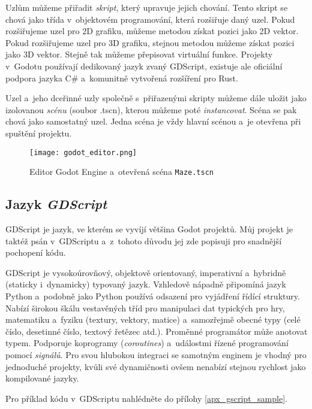Uzlům můžeme přiřadit \textit{skript}, který upravuje jejich chování. Tento skript se chová jako třída v~objektovém programování, která rozšiřuje daný uzel. Pokud rozšiřujeme uzel pro 2D grafiku, můžeme metodou získat pozici jako 2D vektor. Pokud rozšiřujeme uzel pro 3D grafiku, stejnou metodou můžeme získat pozici jako 3D vektor. Stejně tak můžeme přepisovat virtuální funkce. Projekty v~Godotu používají dedikovaný jazyk zvaný GDScript, existuje ale oficiální podpora jazyka C\# a~komunitně vytvořená rozšíření pro Rust.

Uzel a~jeho dceřinné uzly společně s~přiřazenými skripty můžeme dále uložit jako izolovanou \textit{scénu} (soubor .tscn), kterou můžeme poté \textit{instancovat}. Scéna se pak chová jako samostatný uzel. Jedna scéna je vždy hlavní scénou a~je otevřena při spuštění projektu.

\begin{figure}[H]
  \centering
  \texttt{[image: godot\_editor.png]}
  \caption{Editor Godot Engine a~otevřená scéna \texttt{Maze.tscn}}
  \label{godot_editor_maze_tscn}
\end{figure}

\subsection{Jazyk \textit{GDScript}}

GDScript je jazyk, ve kterém se vyvíjí většina Godot projektů. Můj projekt je taktéž psán v~GDScriptu a~z~tohoto důvodu jej zde popisuji pro snadnější pochopení kódu.

GDScript je vysokoúrovňový, objektově orientovaný, imperativní a~hybridně (staticky i~dynamicky) typovaný jazyk. Vzhledově nápadně připomíná jazyk Python a~podobně jako Python používá odsazení pro vyjádření řídící struktury. Nabízí širokou škálu vestavěných tříd pro manipulaci dat typických pro hry, matematiku a~fyziku (textury, vektory, matice) a~samozřejmě obecné typy (celé číslo, desetinné číslo, textový řetězec atd.). Proměnné programátor může anotovat typem. Podporuje koprogramy (\textit{coroutines}) a~událostmi řízené programování pomocí \textit{signálů}. Pro svou hlubokou integraci se samotným enginem je vhodný pro jednoduché projekty, kvůli své dynamičnosti ovšem nenabízí stejnou rychlost jako kompilované jazyky. \cite{gdscript_reference}

Pro příklad kódu v~GDScriptu nahlédněte do přílohy \ref{apx_gscript_sample}.